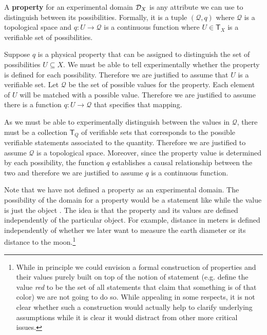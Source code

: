\begin{mathSection}
	\begin{defn}
		A \textbf{property} for an experimental domain $\mathcal{D}_X$ is any attribute we can use to distinguish between its possibilities. Formally, it is a tuple $(\mathcal{Q}, q)$ where $\mathcal{Q}$ is a topological space and $q : U \to \mathcal{Q}$ is a continuous function where $U \in \mathsf{T}_X$ is a verifiable set of possibilities.
	\end{defn}
	\begin{justification}
		Suppose $q$ is a physical property that can be assigned to distinguish the set of possibilities $U \subseteq X$. We must be able to tell experimentally whether the property is defined for each possibility. Therefore we are justified to assume that $U$ is a verifiable set. Let $\mathcal{Q}$ be the set of possible values for the property. Each element of $U$ will be matched with a possible value. Therefore we are justified to assume there is a function $q : U \to \mathcal{Q}$ that specifies that mapping.
		
		As we must be able to experimentally distinguish between the values in $\mathcal{Q}$, there must be a collection $\mathsf{T}_Q$ of verifiable sets that corresponds to the possible verifiable statements associated to the quantity. Therefore we are justified to assume $\mathcal{Q}$ is a topological space. Moreover, since the property value is determined by each possibility, the function $q$ establishes a causal relationship between the two and therefore we are justified to assume $q$ is a continuous function.
	\end{justification}
\end{mathSection}

Note that we have not defined a property as an experimental domain. The possibility of the domain for a property would be a statement like  while the value is just the object . The idea is that the property and its values are defined independently of the particular object. For example, distance in meters is defined independently of whether we later want to measure the earth diameter or its distance to the moon.\footnote{While in principle we could envision a formal construction of properties and their values purely built on top of the notion of statement (e.g. define the value \emph{red} to be the set of all statements that claim that something is of that color) we are not going to do so. While appealing in some respects, it is not clear whether such a construction would actually help to clarify underlying assumptions while it is clear it would distract from other more critical issues.}

